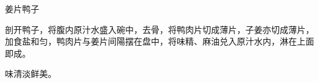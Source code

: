 \begin{recipe}{姜片鸭子}

\ingredients


\cooking

剖开鸭子，将腹内原汁水盛入碗中，去骨，将鸭肉片切成薄片，子姜亦切成薄片，加食盐和匀，鸭肉片与姜片间陽摆在盘中，将味精、麻油兑入原汁水内，淋在上面即成。

\notes

味清淡鲜美。

\end{recipe}

